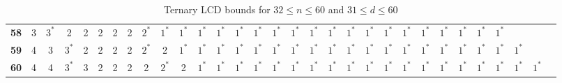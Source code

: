 \begin{landscape}
{\begin{table}
\begin{tabular}{|c| c c c c c c c c c c c c c c c c c c c c c c c c c c c c c c |}
\textbf{58} & 3 & $3^*$ & 2 & 2 & 2 & 2 & 2 & $2^*$ & $1^*$ & $1^*$ & $1^*$ & $1^*$ & $1^*$ & $1^*$ & $1^*$ & $1^*$ & $1^*$ & $1^*$ & $1^*$ & $1^*$ & $1^*$ & $1^*$ & $1^*$ & $1^*$ & $1^*$ & $1^*$ & $1^*$ & & & \\
\textbf{59} & 4 & 3 & $3^*$ & 2 & 2 & 2 & 2 & $2^*$ & 2 & $1^*$ & $1^*$ & $1^*$ & $1^*$ & $1^*$ & $1^*$ & $1^*$ & $1^*$ & $1^*$ & $1^*$ & $1^*$ & $1^*$ & $1^*$ & $1^*$ & $1^*$ & $1^*$ & $1^*$ & $1^*$ & $1^*$ & & \\
\textbf{60} & 4 & 4 & $3^*$ & 3 & 2 & 2 & 2 & 2 & $2^*$ & 2 & $1^*$ & $1^*$ & $1^*$ & $1^*$ & $1^*$ & $1^*$ & $1^*$ & $1^*$ & $1^*$ & $1^*$ & $1^*$ & $1^*$ & $1^*$ & $1^*$ & $1^*$ & $1^*$ & $1^*$ & $1^*$ & $1^*$ & \\
\hline
\end{tabular}
\caption{Ternary LCD bounds for $32 \leq n \leq 60$ and $31 \leq d \leq 60$}
\label{tab:lp_tables_q2_32_60_31_60}
\end{table} 
}
\end{landscape}